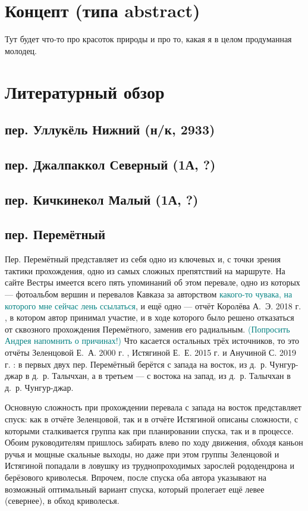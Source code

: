 \documentclass[a4paper, 12pt]{report}
\begin{document}

\tableofcontents









\section{Концепт (типа abstract)} 
Тут будет что-то про красоток природы и про то, какая я в целом продуманная молодец.
\section{Литературный обзор}

\subsection{пер. Уллукёль Нижний (н/к, 2933)} 
\subsection{пер. Джалпаккол Северный (1А, ?)} 
\subsection{пер. Кичкинекол Малый (1А, ?)} 
\subsection{пер. Перемётный} 
Пер. Перемётный представляет из себя одно из ключевых и, с точки зрения тактики прохождения, одно из самых сложных препятствий на маршруте. На сайте Вестры \cite{WestraCat} имеется всего пять упоминаний об этом перевале, одно из которых — фотоальбом вершин и перевалов Кавказа за авторством \textcolor{teal}{какого-то чувака, на которого мне сейчас лень ссылаться}, и ещё одно — отчёт Королёва А.~Э. 2018 г. \cite{Korolyov2018}, в котором автор принимал участие, и в ходе которого было решено отказаться от сквозного прохождения Перемётного, заменив его радиальным. \textcolor{teal}{(Попросить Андрея напомнить о причинах!)} Что касается остальных трёх источников, то это отчёты Зеленцовой Е.~А. 2000 г. \cite{Zelentsova2000}, Истягиной Е.~Е. 2015 г. и Анучиной С. 2019 г. \cite{Anuchina2019}: в первых двух пер. Перемётный берётся с запада на восток, из д.~р. Чунгур-джар в д.~р. Талычхан, а в третьем --- с востока на запад, из д.~р. Талычхан в д.~р. Чунгур-джар. 

Основную сложность при прохождении перевала с запада на восток представляет спуск: как в отчёте Зеленцовой, так и в отчёте Истягиной описаны сложности, с которыми сталкивается группа как при планировании спуска, так и в процессе. Обоим руководителям пришлось забирать влево по ходу движения, обходя каньон ручья и мощные скальные выходы, но даже при этом группы Зеленцовой и Истягиной попадали в ловушку из труднопроходимых зарослей рододендрона и берёзового криволесья. Впрочем, после спуска оба автора указывают на возможный оптимальный вариант спуска, который пролегает ещё левее (севернее), в обход криволесья. 
\end{document}
